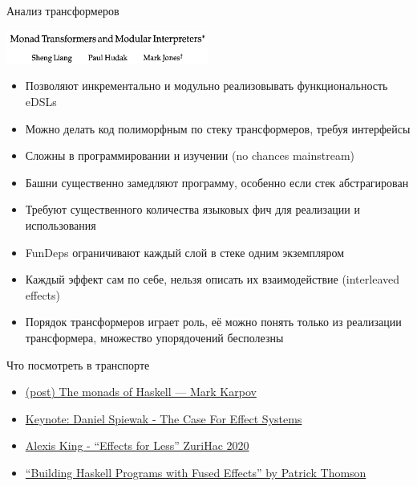     \begin{frame}[fragile]{Анализ трансформеров}
        \begin{center}
            \includegraphics[width=0.5\textwidth]{figs/transformers}
        \end{center}
        \begin{itemize}
            \item[\positive] Позволяют инкрементально и модульно реализовывать функциональность eDSLs
            \item[\positive] Можно делать код полиморфным по стеку трансформеров, требуя интерфейсы
            \item[\negative] Сложны в программировании и изучении (no chances mainstream)
            \item[\negative] Башни существенно замедляют программу, особенно если стек абстрагирован
            \item[\negative] Требуют существенного количества языковых фич для реализации и использования
            \item[\negative] FunDeps ограничивают каждый слой в стеке одним экземпляром
            \item[\negative] Каждый эффект сам по себе, нельзя описать их взаимодействие (interleaved effects)
            \item[\negative] Порядок трансформеров играет роль, её можно понять только из реализации трансформера, множество упорядочений бесполезны
        \end{itemize}
    \end{frame}


    \begin{frame}[fragile]{Что посмотреть в транспорте}
        \begin{itemize}
            \item \href{https://markkarpov.com/post/the-monads}{\color{blue}(post) The monads of Haskell --- Mark Karpov}
            \item \href{https://youtu.be/qgfCmQ-2tW0?si=6BjvijRPU2hEmk49}{\color{blue}  Keynote: Daniel Spiewak - The Case For Effect Systems }
            \item \href{https://www.youtube.com/live/0jI-AlWEwYI?si=KzgcHDgZ4GseytRA}{\color{blue} Alexis King - ``Effects for Less'' ZuriHac 2020}
            \item \href{https://youtu.be/vfDazZfxlNs?si=Sjfitsfe33jpbMth}{\color{blue}  ``Building Haskell Programs with Fused Effects'' by Patrick Thomson}
        \end{itemize}
    \end{frame}

